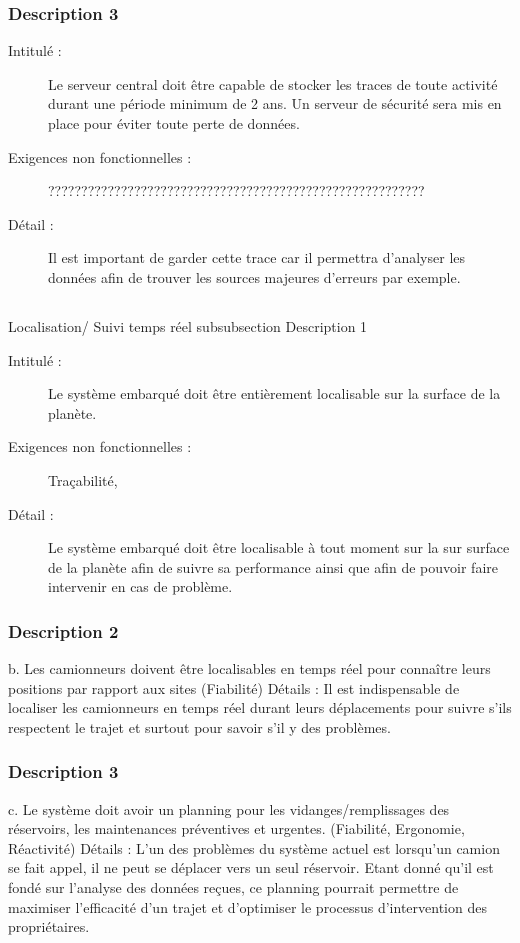 \subsubsection {Description 3}
\begin{description}
           \item[Intitulé :] Le serveur central doit être capable de stocker les traces de toute activité durant une période minimum de 2 ans. Un serveur de sécurité sera mis en place pour éviter toute perte de données. 
           \item[Exigences non fonctionnelles :] ?????????????????????????????????????????????????????????
           \item[Détail :] Il est important de garder cette trace car il permettra d’analyser les données afin de trouver les sources majeures d’erreurs par exemple. 
\end{description}


\subsection {}Localisation/ Suivi temps réel
subsubsection {Description 1}
\begin{description}
           \item[Intitulé :] Le système embarqué doit être entièrement localisable sur la surface de la planète. 
           \item[Exigences non fonctionnelles :] Traçabilité, 
           \item[Détail :] Le système embarqué doit être localisable à tout moment sur la sur surface de la planète afin de suivre sa performance ainsi que afin de pouvoir faire intervenir en cas de problème. 
\end{description}

\subsubsection {Description 2}
b. Les camionneurs doivent être localisables en temps réel pour connaître leurs positions par rapport aux sites (Fiabilité)
Détails : Il est indispensable de localiser les camionneurs en temps réel durant leurs déplacements pour suivre s’ils respectent le trajet et surtout pour savoir s’il y des problèmes.

\subsubsection {Description 3}
c. Le système doit avoir un planning pour les vidanges/remplissages des réservoirs, les maintenances préventives et urgentes. (Fiabilité, Ergonomie, Réactivité)
Détails : L’un des problèmes du système actuel est lorsqu’un camion se fait appel, il ne peut se déplacer vers un seul réservoir. Etant  donné qu’il est fondé sur l’analyse des données reçues, ce planning pourrait permettre de maximiser l’efficacité d’un trajet et d’optimiser le processus d’intervention des propriétaires. 

